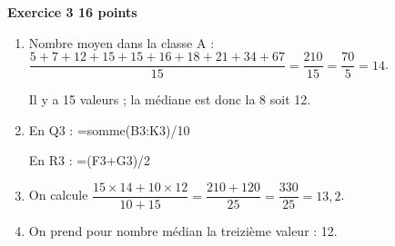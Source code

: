 \textbf{Exercice 3 \hfill 16 points}

\medskip

\begin{enumerate}
\item Nombre moyen dans la classe A : $\dfrac{5 + 7 + 12 + 15 + 15 + 16 + 18 + 21 + 34 + 67}{15} = \dfrac{210}{15} = \dfrac{70}{5} = 14$.

Il y a 15 valeurs ; la médiane est donc la 8 soit 12.
\item En Q3  : =somme(B3\negthinspace:K3)/10

En R3 : =(F3+G3)/2
\item On calcule $\dfrac{15 \times 14 + 10 \times 12}{10 + 15} = \dfrac{210 + 120}{25} = \dfrac{330}{25} = 13,2$.
\item On prend pour nombre médian la treizième valeur : 12.
\end{enumerate}

\newpage

